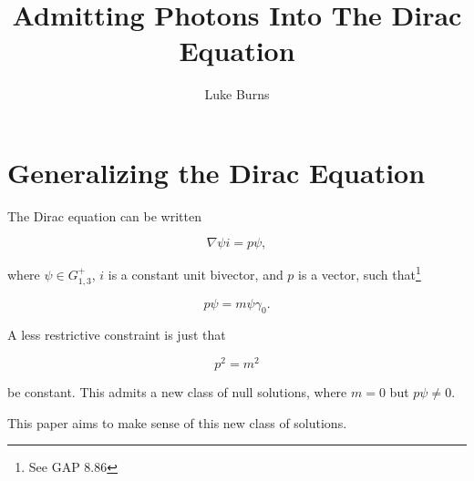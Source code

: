 \documentclass{article}
\title{Admitting Photons Into The Dirac Equation}
\author{Luke Burns}
\begin{document}
  \maketitle

  \section{Generalizing the Dirac Equation}

  The Dirac equation can be written 

  \begin{equation}
    \nabla \psi i = p \psi, \label{eq:dirac}
  \end{equation}

  where $\psi \in G_{1,3}^+$, $i$ is a constant unit bivector, and $p$ is a vector, such that\footnote{See GAP 8.86}

  \begin{equation}
    p \psi = m \psi \gamma_0. \label{eq:momentum}
  \end{equation} 

  A less restrictive constraint is just that

  \begin{equation}
    p^2 = m^2
  \end{equation}

  be constant. This admits a new class of null solutions, where $m = 0$ but $p \psi \not = 0$. 

  This paper aims to make sense of this new class of solutions.
\end{document}
